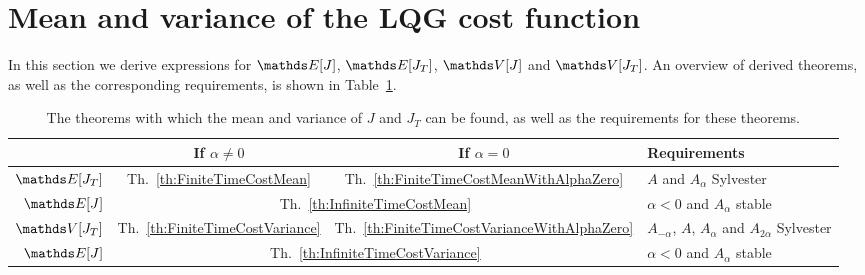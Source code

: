 \documentclass[twocolumn]{autart}
\begin{document}
\section{Mean and variance of the LQG cost function} \label{s:PropertiesOfLQGCost}

In this section we derive expressions for $\ex[J]$, $\ex[J_T]$, $\va[J]$ and $\va[J_T]$. An overview of derived theorems, as well as the corresponding requirements, is shown in Table~\ref{t:TheoremOverview}.

\begin{table}[!t]
	\renewcommand{\arraystretch}{1.2}
	\caption{The theorems with which the mean and variance of $J$ and $J_T$ can be found, as well as the requirements for these theorems.}
	\label{t:TheoremOverview}
	\centering
	\begin{tabular}{|r||c|c|l|}
		\hline
		& \hspace{-3pt}If $\alpha \neq 0$\hspace{-3pt} & \hspace{-3pt}If $\alpha = 0$\hspace{-3pt} & \hspace{-3pt}Requirements \\
		\hline
		\hspace{-5pt} $\ex[J_T]$ \hspace{-5pt} & Th.~\ref{th:FiniteTimeCostMean} & Th.~\ref{th:FiniteTimeCostMeanWithAlphaZero} & \hspace{-3pt}$A$ and $A_\alpha$ Sylvester \\
		\hline
		\hspace{-5pt} $\ex[J]$ \hspace{-5pt} & 
		\multicolumn{2}{|c|}{Th.~\ref{th:InfiniteTimeCostMean}} & \hspace{-3pt}$\alpha < 0$ and $A_\alpha$ stable\hspace{-3pt} \\
		\hline
		\hspace{-5pt} $\va[J_T]$ \hspace{-5pt} & Th.~\ref{th:FiniteTimeCostVariance} & Th.~\ref{th:FiniteTimeCostVarianceWithAlphaZero} & \hspace{-3pt}$A_{-\alpha}$, $A$, $A_\alpha$ and $A_{2\alpha}$ Sylvester\hspace{-3pt} \\
		\hline
		\hspace{-5pt} $\ex[J]$ \hspace{-5pt} & 
		\multicolumn{2}{|c|}{Th.~\ref{th:InfiniteTimeCostVariance}} & \hspace{-3pt}$\alpha < 0$ and $A_\alpha$ stable\hspace{-3pt} \\
		\hline
	\end{tabular}
\end{table}
\end{document}
